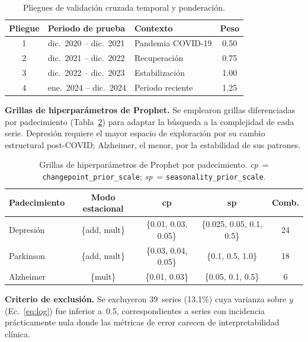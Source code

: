 \documentclass[12pt,a4paper]{article}
\begin{document}
\begin{table}[ht]
\centering
\caption{Pliegues de validación cruzada temporal y ponderación.}
\label{tab:cv}
\begin{tabular}{@{}cllc@{}}
\toprule
\textbf{Pliegue} & \textbf{Periodo de prueba} & \textbf{Contexto} & \textbf{Peso} \\
\midrule
1 & dic.\ 2020 -- dic.\ 2021 & Pandemia COVID-19 & 0.50 \\
2 & dic.\ 2021 -- dic.\ 2022 & Recuperación       & 0.75 \\
3 & dic.\ 2022 -- dic.\ 2023 & Estabilización     & 1.00 \\
4 & ene.\ 2024 -- dic.\ 2024 & Periodo reciente   & 1.25 \\
\bottomrule
\end{tabular}
\end{table}

\noindent\textbf{Grillas de hiperparámetros de Prophet.}
Se emplearon grillas diferenciadas por padecimiento (Tabla~\ref{tab:grids}) para adaptar la búsqueda a la complejidad de cada serie. Depresión requiere el mayor espacio de exploración por su cambio estructural post-COVID; Alzheimer, el menor, por la estabilidad de sus patrones.

\begin{table}[ht]
\centering
\caption{Grillas de hiperparámetros de Prophet por padecimiento. \textit{cp}~= \texttt{changepoint\_prior\_scale}; \textit{sp}~= \texttt{seasonality\_prior\_scale}.}
\label{tab:grids}
\begin{tabular}{@{}lcccc@{}}
\toprule
\textbf{Padecimiento} & \textbf{Modo estacional} & \textbf{cp} & \textbf{sp} & \textbf{Comb.} \\
\midrule
Depresión  & \{add, mult\} & \{0.01, 0.03, 0.05\} & \{0.025, 0.05, 0.1, 0.5\} & 24 \\
Parkinson  & \{add, mult\} & \{0.03, 0.04, 0.05\} & \{0.1, 0.5, 1.0\}         & 18 \\
Alzheimer  & \{mult\}      & \{0.01, 0.03\}        & \{0.05, 0.1, 0.5\}        & 6  \\
\bottomrule
\end{tabular}
\end{table}

\noindent\textbf{Criterio de exclusión.}
Se excluyeron 39~series (13.1\%) cuya varianza sobre $y$ (Ec.~\ref{eq:log}) fue inferior a~0.5, correspondientes a series con incidencia prácticamente nula donde las métricas de error carecen de interpretabilidad clínica.
\end{document}
